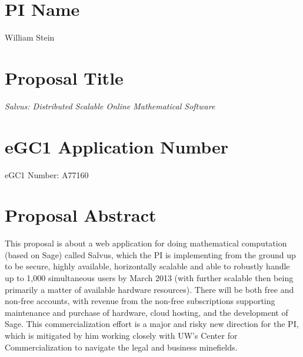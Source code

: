 \documentclass[11pt]{article}
\begin{document}
\mbox{}\vspace{4ex}

\section*{PI Name} 
William Stein

\vspace{3ex}
\section*{Proposal Title} 
{\em Salvus: Distributed Scalable Online Mathematical Software}

\vspace{3ex}

\section*{eGC1 Application Number} 
eGC1 Number: A77160

\vspace{3ex}

\section*{Proposal Abstract} 
This proposal is about a web application for doing mathematical
computation (based on Sage) called Salvus, which the PI is
implementing from the ground up to be secure, highly available,
horizontally scalable and able to robustly handle up to 1,000
simultaneous users by March 2013 (with further scalable then being
primarily a matter of available hardware resources).  There will be
both free and non-free accounts, with revenue from the non-free
subscriptions supporting maintenance and purchase of hardware, cloud
hosting, and the development of Sage.  This commercialization effort
is a major and risky new direction for the PI, which is mitigated by
him working closely with UW's Center for Commercialization to navigate
the legal and business minefields.

\vspace{3ex}
\end{document}
